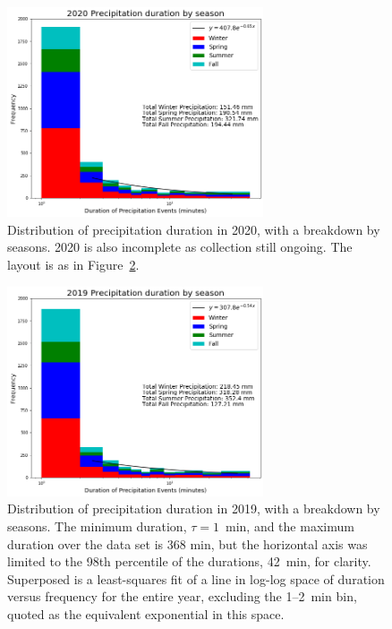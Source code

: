 \documentclass[11pt]{report}
\begin{document}
\begin{figure}[t]
	\centering
	\includegraphics[width=0.675\textwidth]{Figures/precip_2020.png}
	\caption[Precipitation histogram for 2020 broken down by season]{\label{p2020}
		Distribution of precipitation duration in 2020, with a breakdown
		by seasons. 2020 is also incomplete as collection still ongoing. The layout is as in Figure~\ref{p2019}.}
\end{figure}
\begin{figure}[b]
  \centering
  \includegraphics[width=0.675\textwidth]{Figures/More_detail_precip_2019.png}
  \caption[Precipitation histogram for 2019 broken down by
    season]{\label{p2019} Distribution of precipitation duration in
    2019, with a breakdown by seasons. The minimum duration,
    $\tau=1$~min, and the maximum duration over the data set is 368
    min, but the horizontal axis was limited to the 98th percentile of
    the durations, 42~min, for clarity. Superposed is a least-squares
    fit of a line in log-log space of duration versus frequency for
    the entire year, excluding the 1--2~min bin, quoted as the
    equivalent exponential in this space.}
\end{figure}
\end{document}

